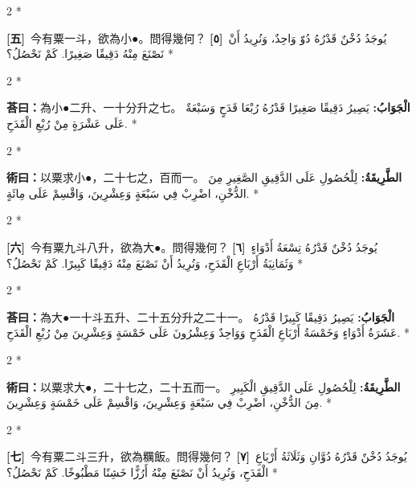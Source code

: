 \documentclass[11pt,a4paper]{article}
\newcommand{\ar}[1]{\arabicfont\beginR #1\endR}
\newcommand{\problemnum}[1]{\textbf{[\ignorespaces#1\unskip]}}
\newenvironment{bilingual}{%
  \begin{paracol}{2}%
  \switchcolumn[0]*%
}{%
  \end{paracol}%
}
\newcommand{\cnline}[1]{\switchcolumn[0]\noindent #1 \switchcolumn[1]}
\newcommand{\arline}[1]{\noindent\ar{#1} \switchcolumn[0]*}
\newenvironment{prob bilingual}{%
  \begin{paracol}{2}%
  \switchcolumn[0]*%
}{%
  \end{paracol}%
  \vspace{0.3em}%
}
\begin{document}
\begin{bilingual}
\cnline{\problemnum{五}\, 今有粟一斗，欲為小●。問得幾何？}
\arline{\problemnum{٥}\, يُوجَدُ دُخْنٌ قَدْرُهُ دُوّ وَاحِدٌ، وَنُرِيدُ أَنْ نَصْنَعَ مِنْهُ دَقِيقًا صَغِيرًا. كَمْ نَحْصُلُ؟}
\end{bilingual}

\begin{bilingual}
\cnline{\textcolor{answercolor}{\textbf{荅曰：}}為小●二升、一十分升之七。}
\arline{\textcolor{answercolor}{\textbf{الْجَوَابُ:}} يَصِيرُ دَقِيقًا صَغِيرًا قَدْرُهُ رُبْعَا قَدَحٍ وَسَبْعَةٌ عَلَى عَشْرَةٍ مِنْ رُبْعِ الْقَدَحِ.}
\end{bilingual}

\begin{bilingual}
\cnline{%
\textcolor{methodcolor}{\textbf{術曰：}}以粟求小●，二十七之，百而一。
}
\arline{%
\textcolor{methodcolor}{\textbf{الطَّرِيقَةُ:}} لِلْحُصُولِ عَلَى الدَّقِيقِ الصَّغِيرِ مِنَ الدُّخْنِ، اضْرِبْ فِي سَبْعَةٍ وَعِشْرِينَ، وَاقْسِمْ عَلَى مِائَةٍ.
}
\end{bilingual}

\begin{bilingual}
\cnline{\problemnum{六}\, 今有粟九斗八升，欲為大●。問得幾何？}
\arline{\problemnum{٦}\, يُوجَدُ دُخْنٌ قَدْرُهُ تِسْعَةُ أَدْوَاءٍ وَثَمَانِيَةُ أَرْبَاعِ الْقَدَحِ، وَنُرِيدُ أَنْ نَصْنَعَ مِنْهُ دَقِيقًا كَبِيرًا. كَمْ نَحْصُلُ؟}
\end{bilingual}

\begin{bilingual}
\cnline{\textcolor{answercolor}{\textbf{荅曰：}}為大●一十斗五升、二十五分升之二十一。}
\arline{\textcolor{answercolor}{\textbf{الْجَوَابُ:}} يَصِيرُ دَقِيقًا كَبِيرًا قَدْرُهُ عَشَرَةُ أَدْوَاءٍ وَخَمْسَةُ أَرْبَاعِ الْقَدَحِ وَوَاحِدٌ وَعِشْرُونَ عَلَى خَمْسَةٍ وَعِشْرِينَ مِنْ رُبْعِ الْقَدَحِ.}
\end{bilingual}

\begin{bilingual}
\cnline{%
\textcolor{methodcolor}{\textbf{術曰：}}以粟求大●，二十七之，二十五而一。
}
\arline{%
\textcolor{methodcolor}{\textbf{الطَّرِيقَةُ:}} لِلْحُصُولِ عَلَى الدَّقِيقِ الْكَبِيرِ مِنَ الدُّخْنِ، اضْرِبْ فِي سَبْعَةٍ وَعِشْرِينَ، وَاقْسِمْ عَلَى خَمْسَةٍ وَعِشْرِينَ.
}
\end{bilingual}


\begin{bilingual}
\cnline{\problemnum{七}\, 今有粟二斗三升，欲為糲飯。問得幾何？}
\arline{\problemnum{٧}\, يُوجَدُ دُخْنٌ قَدْرُهُ دُوَّانِ وَثَلَاثَةُ أَرْبَاعِ الْقَدَحِ، وَنُرِيدُ أَنْ نَصْنَعَ مِنْهُ أَرُزًّا خَشِنًا مَطْبُوخًا. كَمْ نَحْصُلُ؟}
\end{bilingual}
\end{document}
